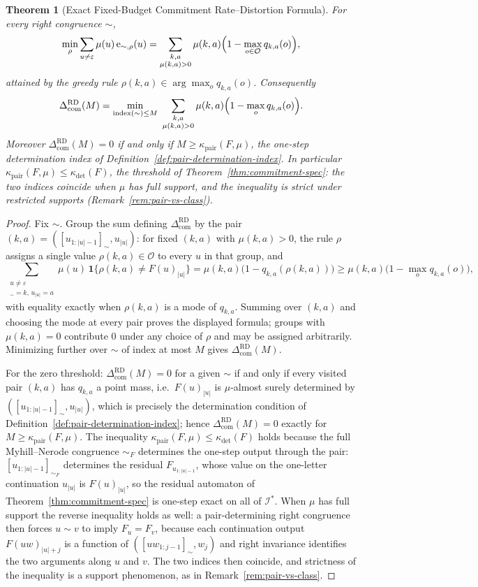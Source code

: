\documentclass[12pt]{article}
\newtheorem{theorem}{Theorem}[section]
\theoremstyle{definition}
\newcommand{\ComRD}{\Delta_{\mathrm{com}}^{\mathrm{RD}}}
\begin{document}
\begin{theorem}[Exact Fixed-Budget Commitment Rate--Distortion Formula]
\label{thm:com-rd-formula}
For every right congruence $\sim$,
\[
\min_\rho
\sum_{u\ne\varepsilon}
\mu(u)\,\mathrm e_{\sim,\rho}(u)
=
\sum_{\substack{k,a\\ \mu(k,a)>0}}
\mu(k,a)
\Bigl(1-\max_{o\in\mathcal O}q_{k,a}(o)\Bigr),
\]
attained by the greedy rule $\rho(k,a)\in\arg\max_oq_{k,a}(o)$.  Consequently
\[
\ComRD(M)
=
\min_{\operatorname{index}(\sim)\le M}
\ \sum_{\substack{k,a\\ \mu(k,a)>0}}
\mu(k,a)
\Bigl(1-\max_{o}q_{k,a}(o)\Bigr).
\]
Moreover $\ComRD(M)=0$ if and only if
$M\ge\kappa_{\mathrm{pair}}(F,\mu)$, the one-step determination index of
Definition~\ref{def:pair-determination-index}.  In particular
$\kappa_{\mathrm{pair}}(F,\mu)\le\kappa_{\det}(F)$, the threshold of
Theorem~\ref{thm:commitment-spec}: the two indices coincide when $\mu$ has
full support, and the inequality is strict under restricted supports
(Remark~\ref{rem:pair-vs-class}).
\end{theorem}

\begin{proof}
Fix $\sim$.  Group the sum defining $\ComRD$ by the pair
$(k,a)=([u_{1:|u|-1}]_\sim,u_{|u|})$: for fixed $(k,a)$ with $\mu(k,a)>0$, the
rule $\rho$ assigns a single value $\rho(k,a)\in\mathcal O$ to every $u$ in
that group, and
\[
\sum_{\substack{u\ne\varepsilon\\ [u_{1:|u|-1}]_\sim=k,\,u_{|u|}=a}}
\mu(u)\,\mathbf 1\{\rho(k,a)\ne F(u)_{|u|}\}
=
\mu(k,a)\bigl(1-q_{k,a}(\rho(k,a))\bigr)
\ge
\mu(k,a)\bigl(1-\max_oq_{k,a}(o)\bigr),
\]
with equality exactly when $\rho(k,a)$ is a mode of $q_{k,a}$.  Summing over
$(k,a)$ and choosing the mode at every pair proves the displayed formula;
groups with $\mu(k,a)=0$ contribute $0$ under any choice of $\rho$ and may be
assigned arbitrarily.  Minimizing further over $\sim$ of index at most $M$
gives $\ComRD(M)$.

For the zero threshold: $\ComRD(M)=0$ for a given $\sim$ if and only if every
visited pair $(k,a)$ has $q_{k,a}$ a point mass, i.e.\ $F(u)_{|u|}$ is
$\mu$-almost surely determined by $([u_{1:|u|-1}]_\sim,u_{|u|})$, which is
precisely the determination condition of Definition~\ref{def:pair-determination-index};
hence $\ComRD(M)=0$ exactly for $M\ge\kappa_{\mathrm{pair}}(F,\mu)$.  The
inequality $\kappa_{\mathrm{pair}}(F,\mu)\le\kappa_{\det}(F)$ holds because
the full Myhill--Nerode congruence $\sim_F$ determines the one-step output
through the pair: $[u_{1:|u|-1}]_{\sim_F}$ determines the residual
$F_{u_{1:|u|-1}}$, whose value on the one-letter continuation $u_{|u|}$ is
$F(u)_{|u|}$, so the residual automaton of Theorem~\ref{thm:commitment-spec}
is one-step exact on all of $\mathcal I^*$.  When $\mu$ has full support the
reverse inequality holds as well: a pair-determining right congruence then
forces $u\sim v$ to imply $F_u=F_v$, because each continuation output
$F(uw)_{|u|+j}$ is a function of $([uw_{1:j-1}]_\sim,w_j)$ and right
invariance identifies the two arguments along $u$ and $v$.  The two indices
then coincide, and strictness of the inequality is a support phenomenon, as
in Remark~\ref{rem:pair-vs-class}.
\end{proof}
\end{document}
